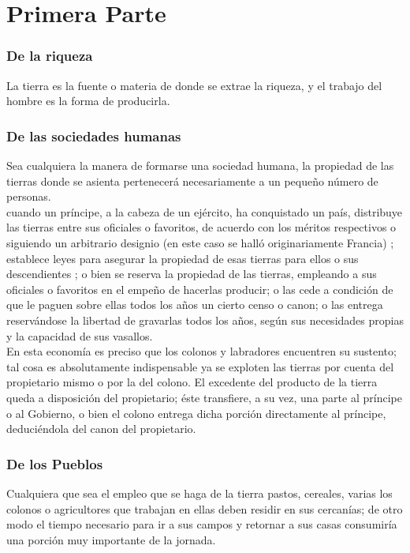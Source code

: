 \documentclass[10pt]{article}
\begin{document}
\part*{\center Primera Parte}
\begin{multicols}{1}
\section*{De la riqueza}
La tierra es la fuente o materia de donde se extrae la riqueza, y el trabajo del hombre es la forma de producirla.
\section*{De las sociedades humanas}
Sea cualquiera la manera de formarse una sociedad humana, la propiedad de las tierras donde se asienta pertenecerá necesariamente a un pequeño número de personas.\\
cuando un príncipe, a la cabeza de un ejército, ha conquistado un país, distribuye las tierras entre sus oficiales o favoritos, de acuerdo con los méritos respectivos o siguiendo un arbitrario designio (en este caso se halló originariamente Francia) ; establece leyes para asegurar la propiedad de esas tierras para ellos o sus descendientes ; o bien se reserva la propiedad de las tierras, empleando a sus oficiales o favoritos en el empeño de hacerlas producir; o las cede a condición de que le paguen sobre ellas todos los años un cierto censo o canon; o las entrega reservándose la libertad de gravarlas todos los años, según sus necesidades propias y la capacidad de sus vasallos.\\
En esta economía es preciso que los colonos y labradores encuentren su sustento; tal cosa es absolutamente indispensable ya se exploten las tierras por cuenta del propietario mismo o por la del colono. El excedente del producto de la tierra queda a disposición del propietario; éste transfiere, a su vez, una parte al príncipe o al Gobierno, o bien el colono entrega dicha porción directamente al príncipe, deduciéndola del canon del propietario.
\section*{De los Pueblos}
Cualquiera que sea el empleo que se haga de la tierra pastos, cereales, varias los colonos o agricultores que trabajan en ellas deben residir en sus cercanías; de otro modo el tiempo necesario para ir a sus campos y retornar a sus casas consumiría una porción muy importante de la jornada.

\end{multicols}
\end{document}
